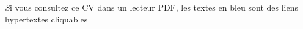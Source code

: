 \documentclass[
  fontsize=10pt
]{resume}
\begin{document}

\begin{center}
	\vfill
	\scriptsize
	{
		\textit
		Si vous consultez ce CV dans un lecteur PDF, {\color{blue-800}les textes en
				bleu} sont des liens hypertextes cliquables
	}
\end{center}
\end{document}
